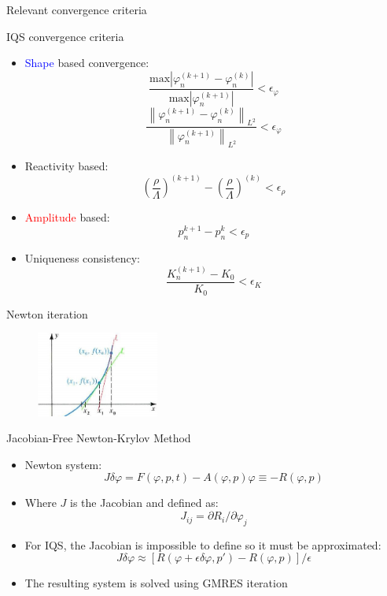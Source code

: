 \documentclass[8pt,xcolor=dvipnames]{beamer}
\newcommand{\be}{\begin{equation*}}
\newcommand{\ee}{\end{equation*}}
\newcommand{\bi}{\begin{itemize}}
\newcommand{\ei}{\end{itemize}}
\newcommand{\norm}[1]{\left\lVert#1\right\rVert_{L^2}}
\newcommand{\tcr}[1]{\textcolor{red}{#1}}
\newcommand{\tcb}[1]{\textcolor{blue}{#1}}
\begin{document}
\begin{frame}{Relevant convergence criteria}

\begin{block}{IQS convergence criteria}
\begin{itemize}
\item \tcb{Shape} based convergence:
\be
\frac{\text{max}\left|\varphi_{n}^{(k+1)} - \varphi_{n}^{(k)}\right|}{\text{max}\left|\varphi_{n}^{(k+1)}\right|} < \epsilon_{\varphi}
\ee 
\be
\frac{\norm{\varphi_{n}^{(k+1)} - \varphi_{n}^{(k)}}}{\norm{\varphi_{n}^{(k+1)}}} < \epsilon_{\varphi}
\ee 

\item Reactivity based:
\be
\left(\frac{\rho}{\Lambda}\right)^{(k+1)} - \left(\frac{\rho}{\Lambda}\right)^{(k)} < \epsilon_{\rho}
\ee

\item \tcr{Amplitude} based:
\be 
p_n^{k+1} - p_n^{k} < \epsilon_p
\ee

\item Uniqueness consistency:
\be 
\frac{K_n^{(k+1)} - K_0}{K_0} < \epsilon_K
\ee
\end{itemize}
\end{block}

\end{frame}

\begin{frame}{Newton iteration}
\vspace{-3mm}
\begin{figure}
\includegraphics[height=1.1in]{figures/newton_iter.jpg}
\end{figure}
\vspace{-3mm}
\begin{block}{Jacobian-Free Newton-Krylov Method}
\bi
\item Newton system:
\be
J\delta\varphi = F(\varphi,p,t) - A(\varphi,p)\varphi \equiv -R(\varphi,p)
\ee
\item Where $J$ is the Jacobian and defined as:
\be
J_{ij}=\partial R_i/\partial\varphi_j
\ee
\item For IQS, the Jacobian is impossible to define so it must be approximated:
\be
J\delta\varphi\approx[R(\varphi+\epsilon\delta\varphi,p')-R(\varphi,p)]/\epsilon
\ee
\item The resulting system is solved using GMRES iteration
\ei
\end{block}

\end{frame}
\end{document}
